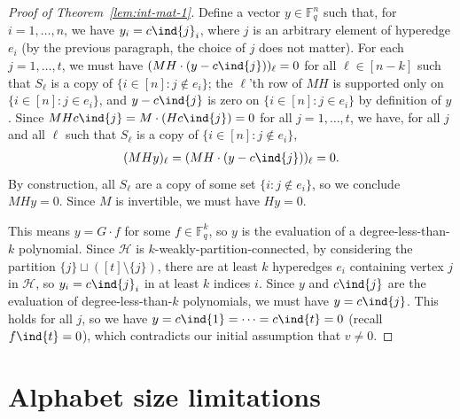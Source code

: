 \documentclass{article}[11pt]
\begin{document}
\begin{proof}[Proof of Theorem~\ref{lem:int-mat-1}]
Define a vector $y\in\mathbb{F}_q^n$ such that, for $i=1,\dots,n$, we have $y_i = c\ind{j}_i$, where $j$ is an arbitrary element of hyperedge $e_i$ (by the previous paragraph, the choice of $j$ does not matter).
  For each $j=1,\dots,t$, we must have $(MH\cdot (y-c\ind{j}))_\ell = 0$ for all $\ell \in [n-k]$ such that $S_\ell$ is a copy of $\{i \in [n] : j\notin e_i\}$; the $\ell$'th row of $MH$ is supported only on $\{i \in [n] : j\in e_i\}$, and $y-c\ind{j}$ is zero on $\{i \in [n] : j\in e_i\}$ by definition of $y$.
  Since $MHc\ind{j} = M\cdot(Hc\ind{j}) = 0$ for all $j=1,\dots,t$, we have, for all $j$ and all $\ell$ such that $S_\ell$ is a copy of $\{i \in [n] : j\notin e_i\}$,
  \begin{align}
    (MHy)_\ell = (MH\cdot (y-c\ind{j}))_\ell = 0.
    \label{}
  \end{align}
  By construction, all $S_\ell$ are a copy of some set $\{i:j\notin e_i\}$, so we conclude $MHy=0$.
  Since $M$ is invertible, we must have $Hy = 0$.

  This means $y = G\cdot f$ for some $f\in \mathbb{F}_q^k$, so $y$ is the evaluation of a degree-less-than-$k$ polynomial.
  Since $\mathcal{H}$ is $k$-weakly-partition-connected, by considering the partition $\{j\}\sqcup ([t]\setminus\{j\})$, there are at least $k$ hyperedges $e_i$ containing vertex $j$ in $\mathcal{H}$, so $y_i = c\ind{j}_i$ in at least $k$ indices $i$.
  Since $y$ and $c\ind{j}$ are the evaluation of degree-less-than-$k$ polynomials, we must have $y=c\ind{j}$. This holds for all $j$, so we have $y=c\ind{1}=\cdots=c\ind{t} = 0$ (recall $f\ind{t}=0$), which contradicts our initial assumption that $v\neq 0$.
\end{proof}














\section{Alphabet size limitations}
\label{app:lb}
\end{document}
